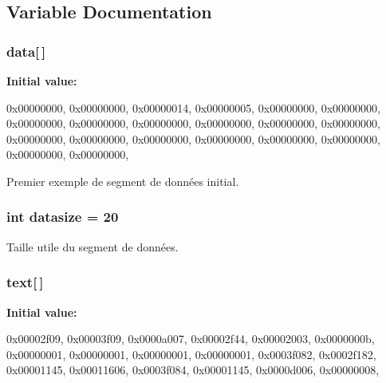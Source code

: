 \subsection{\-Variable \-Documentation}
\hypertarget{prog__subroutine-bin_8c_a0a1a7765b8d407ad9c19649d5a9dd699}{
\subsubsection[{data}]{ {\bf data}\mbox{[}$\,$\mbox{]}}}\label{prog__subroutine-bin_8c_a0a1a7765b8d407ad9c19649d5a9dd699}
{\bfseries \-Initial value\-:}
\begin{DoxyCode}
 {
    0x00000000, 0x00000000, 0x00000014, 0x00000005, 
    0x00000000, 0x00000000, 0x00000000, 0x00000000, 
    0x00000000, 0x00000000, 0x00000000, 0x00000000, 
    0x00000000, 0x00000000, 0x00000000, 0x00000000, 
    0x00000000, 0x00000000, 0x00000000, 0x00000000, 
}
\end{DoxyCode}


\-Premier exemple de segment de données initial. 

\hypertarget{prog__subroutine-bin_8c_a5c7949e884a8b9b3d1ab9f070267bf33}{
\subsubsection[{datasize}]{\setlength{\rightskip}{0pt plus 5cm}int {\bf datasize} = 20}}\label{prog__subroutine-bin_8c_a5c7949e884a8b9b3d1ab9f070267bf33}


\-Taille utile du segment de données. 

\hypertarget{prog__subroutine-bin_8c_a53ae7c86b11d9a664628491ba41ca09d}{
\subsubsection[{text}]{ {\bf text}\mbox{[}$\,$\mbox{]}}}\label{prog__subroutine-bin_8c_a53ae7c86b11d9a664628491ba41ca09d}
{\bfseries \-Initial value\-:}
\begin{DoxyCode}
 {
    0x00002f09, 0x00003f09, 0x0000a007, 0x00002f44, 
    0x00002003, 0x0000000b, 0x00000001, 0x00000001, 
    0x00000001, 0x00000001, 0x0003f082, 0x0002f182, 
    0x00001145, 0x00011606, 0x0003f084, 0x00001145, 
    0x0000d006, 0x00000008, 
}
\end{DoxyCode}


